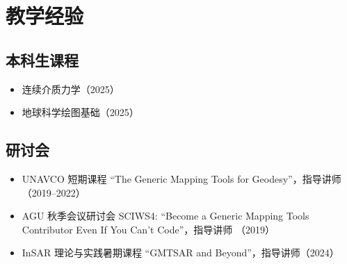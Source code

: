 \section{教学经验}

\subsection{本科生课程}
\begin{itemize}
\item 连续介质力学（2025）
\item 地球科学绘图基础（2025）
\end{itemize}

\subsection{研讨会}
\begin{itemize}
\item UNAVCO 短期课程 ``The Generic Mapping Tools for Geodesy''，指导讲师（2019--2022）
\item AGU 秋季会议研讨会 SCIWS4: ``Become a Generic Mapping Tools Contributor Even If You Can't Code''，指导讲师 （2019）
\item InSAR 理论与实践暑期课程 ``GMTSAR and Beyond''，指导讲师（2024）
\end{itemize}
